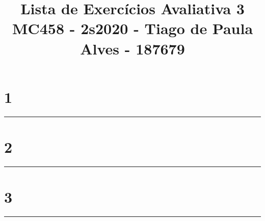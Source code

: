 \documentclass[a4paper, 14pt]{extarticle}
\title{\vspace{-2.5cm}\Large Lista de Exercícios Avaliativa 3 \\ \normalsize MC458 - 2s2020 - Tiago de Paula Alves - 187679}
\theoremstyle{plain}
\theoremstyle{definicao}
\newcommand{\docline}[1][\\]{%
    #1\noindent\rule{\textwidth}{0.4pt}%
    \pagebreak%
}
\begin{document}
    \maketitle
    \thispagestyle{empty}

    \section{1}
    \begingroup
        
    \endgroup

    \docline[]

    \section{2}
    \begingroup
        
    \endgroup

    \docline[]

    \section{3}
    \begingroup
        
    \endgroup

    \docline[]
\end{document}
